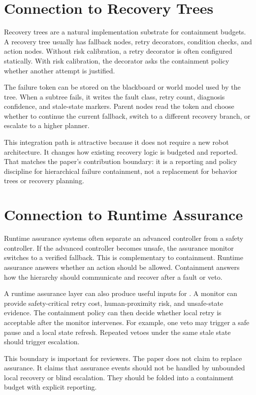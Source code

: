 \section{Connection to Recovery Trees}

Recovery trees are a natural implementation substrate for containment budgets. A recovery tree usually has fallback nodes, retry decorators, condition checks, and action nodes. Without risk calibration, a retry decorator is often configured statically. With risk calibration, the decorator asks the containment policy whether another attempt is justified.

The failure token can be stored on the blackboard or world model used by the tree. When a subtree fails, it writes the fault class, retry count, diagnosis confidence, and stale-state markers. Parent nodes read the token and choose whether to continue the current fallback, switch to a different recovery branch, or escalate to a higher planner.

This integration path is attractive because it does not require a new robot architecture. It changes how existing recovery logic is budgeted and reported. That matches the paper's contribution boundary: it is a reporting and policy discipline for hierarchical failure containment, not a replacement for behavior trees or recovery planning.

\section{Connection to Runtime Assurance}

Runtime assurance systems often separate an advanced controller from a safety controller. If the advanced controller becomes unsafe, the assurance monitor switches to a verified fallback. This is complementary to containment. Runtime assurance answers whether an action should be allowed. Containment answers how the hierarchy should communicate and recover after a fault or veto.

A runtime assurance layer can also produce useful inputs for \method. A monitor can provide safety-critical retry cost, human-proximity risk, and unsafe-state evidence. The containment policy can then decide whether local retry is acceptable after the monitor intervenes. For example, one veto may trigger a safe pause and a local state refresh. Repeated vetoes under the same stale state should trigger escalation.

This boundary is important for reviewers. The paper does not claim to replace assurance. It claims that assurance events should not be handled by unbounded local recovery or blind escalation. They should be folded into a containment budget with explicit reporting.

